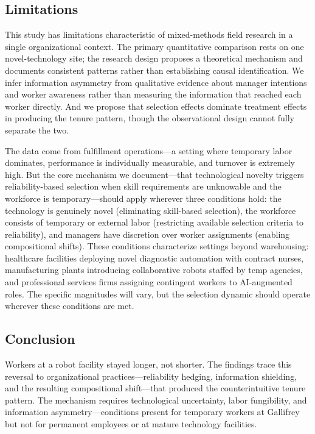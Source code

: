 \documentclass[12pt]{article}
\begin{document}
\subsection{Limitations}

This study has limitations characteristic of mixed-methods field research in a single organizational context. The primary quantitative comparison rests on one novel-technology site; the research design proposes a theoretical mechanism and documents consistent patterns rather than establishing causal identification. We infer information asymmetry from qualitative evidence about manager intentions and worker awareness rather than measuring the information that reached each worker directly. And we propose that selection effects dominate treatment effects in producing the tenure pattern, though the observational design cannot fully separate the two.

The data come from fulfillment operations---a setting where temporary labor dominates, performance is individually measurable, and turnover is extremely high. But the core mechanism we document---that technological novelty triggers reliability-based selection when skill requirements are unknowable and the workforce is temporary---should apply wherever three conditions hold: the technology is genuinely novel (eliminating skill-based selection), the workforce consists of temporary or external labor (restricting available selection criteria to reliability), and managers have discretion over worker assignments (enabling compositional shifts). These conditions characterize settings beyond warehousing: healthcare facilities deploying novel diagnostic automation with contract nurses, manufacturing plants introducing collaborative robots staffed by temp agencies, and professional services firms assigning contingent workers to AI-augmented roles. The specific magnitudes will vary, but the selection dynamic should operate wherever these conditions are met.

\subsection{Conclusion}

Workers at a robot facility stayed longer, not shorter. The findings trace this reversal to organizational practices---reliability hedging, information shielding, and the resulting compositional shift---that produced the counterintuitive tenure pattern. The mechanism requires technological uncertainty, labor fungibility, and information asymmetry---conditions present for temporary workers at Gallifrey but not for permanent employees or at mature technology facilities.
\end{document}
